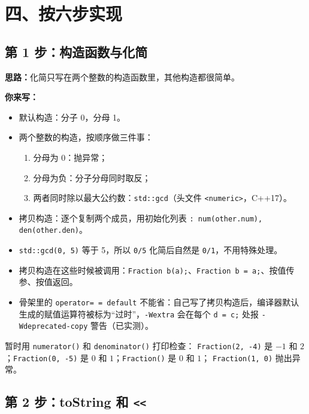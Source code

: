 \documentclass[11pt,a4paper]{article}
\newcommand{\code}[1]{\texttt{#1}}
\newcommand{\idea}{\textbf{思路：}}
\newcommand{\todo}{\textbf{你来写：}}
\begin{document}
\section{四、按六步实现}

\subsection{第 1 步：构造函数与化简}

\idea 化简只写在两个整数的构造函数里，其他构造都很简单。

\todo
\begin{itemize}
  \item 默认构造：分子 0，分母 1。
  \item 两个整数的构造，按顺序做三件事：
  \begin{enumerate}
    \item 分母为 0：抛异常；
    \item 分母为负：分子分母同时取反；
    \item 两者同时除以最大公约数：\code{std::gcd}（头文件 \code{<numeric>}，C++17）。
  \end{enumerate}
  \item 拷贝构造：逐个复制两个成员，用初始化列表 \code{: num(other.num), den(other.den)}。
\end{itemize}

\begin{tip}
\begin{itemize}[leftmargin=1.2em]
  \item \code{std::gcd(0, 5)} 等于 5，所以 \code{0/5} 化简后自然是 \code{0/1}，不用特殊处理。
  \item 拷贝构造在这些时候被调用：\code{Fraction b(a);}、\code{Fraction b = a;}、按值传参、按值返回。
  \item 骨架里的 \code{operator= = default} 不能省：自己写了拷贝构造后，编译器默认生成的赋值运算符被标为“过时”，\code{-Wextra} 会在每个 \code{d = c;} 处报 \code{-Wdeprecated-copy} 警告（已实测）。
\end{itemize}
\end{tip}

\begin{done}
暂时用 \code{numerator()} 和 \code{denominator()} 打印检查：
\code{Fraction(2, -4)} 是 $-1$ 和 $2$；\code{Fraction(0, -5)} 是 $0$ 和 $1$；\code{Fraction()} 是 $0$ 和 $1$；
\code{Fraction(1, 0)} 抛出异常。
\end{done}

\subsection{第 2 步：toString 和 \texttt{<<}}
\end{document}

